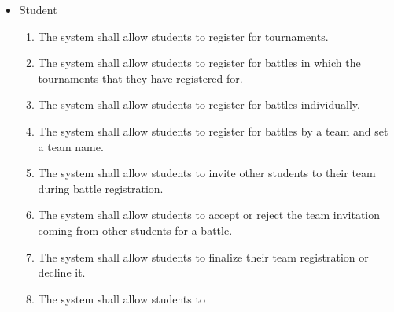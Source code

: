 \begin{itemize}
	\item Student
        \begin{enumerate}[resume]
		\item The system shall allow students to register for tournaments.
		\item The system shall allow students to register for battles in which the tournaments that they have registered for.
  \item The system shall allow students to register for battles individually.
  \item The system shall allow students to register for battles by a team and set a team name.
  \item The system shall allow students to invite other students to their team during battle registration.
  \item The system shall allow students to accept or reject the team invitation coming from other students for a battle.
  \item The system shall allow students to finalize their team registration or decline it.
  \item The system shall allow students to 
  
	\end{enumerate}




\end{itemize}
